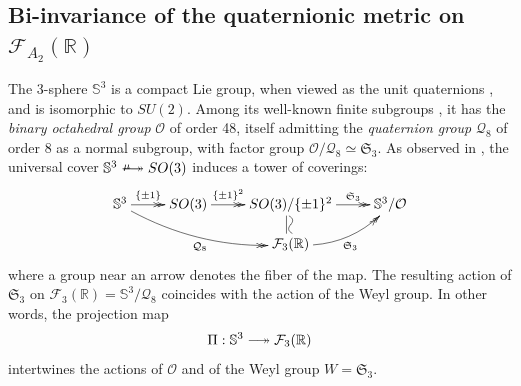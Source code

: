 \documentclass[11pt,twoside]{amsart}
\makeatletter
\theoremstyle{plain}
\newcommand{\R}{{\mathbb R}}
\newcommand{\Sph}{\mathbb{S}}
\newcommand{\Sym}{\mathfrak{S}}
\DeclareRobustCommand\longtwoheadrightarrow
     {\relbar\joinrel\twoheadrightarrow}
\newcommand{\eq}[1][r]
{\ar@<-3pt>@{-}[#1]
\ar@<-1pt>@{}[#1]|<{}="gauche"
\ar@<+0pt>@{}[#1]|-{}="milieu"
\ar@<+1pt>@{}[#1]|>{}="droite"
\ar@/^2pt/@{-}"gauche";"milieu"
\ar@/_2pt/@{-}"milieu";"droite"}
\makeatother
\begin{document}
\subsection{Bi-invariance of the quaternionic metric on $\mathcal{F}_{A_2}(\R)$}\label{biinvariance}

The 3-sphere $\Sph^3$ is a compact Lie group, when viewed as the unit quaternions \cite[Chap. 5]{URG}, and is isomorphic to $SU(2)$. Among its well-known finite subgroups \cite[Theorem 5.12]{URG}, it has the \textit{binary octahedral group} $\mathcal{O}$ of order 48, itself admitting the \textit{quaternion group} $\mathcal{Q}_8$ of order 8 as a normal subgroup, with factor group $\mathcal{O}/\mathcal{Q}_8\simeq\Sym_3$. As observed in \cite[\S 4.4]{chirivi-garnier-spreafico}, the universal cover $\Sph^3\stackrel{\tiny{\mu}}\longtwoheadrightarrow SO(3)$ induces a tower of coverings:
\[\xymatrix@R-1pc{\Sph^3 \ar@/_10pt/@{->>}_{\mathcal{Q}_8}[rrd] \ar@{->>}^<<<<<{\{\pm1\}}[r] & SO(3) \ar@{->>}^<<<<<{\{\pm1\}^2}[r] & SO(3)/\{\pm1\}^2 \eq[d] \ar@{->>}^<<<<<{\Sym_3}[r] & \Sph^3/\mathcal{O} \\ & & \mathcal{F}_3(\R) \ar@/_10pt/@{->>}_{\Sym_3}[ru] & }\]
where a group near an arrow denotes the fiber of the map. The resulting action of $\Sym_3$ on $\mathcal{F}_3(\R)=\Sph^3/\mathcal{Q}_8$ coincides with the action of the Weyl group. In other words, the projection map
\begin{equation}\label{projection_map}
\Pi : \Sph^3\longtwoheadrightarrow\mathcal{F}_3(\R)
\end{equation}
intertwines the actions of $\mathcal{O}$ and of the Weyl group $W=\Sym_3$. %
\end{document}
